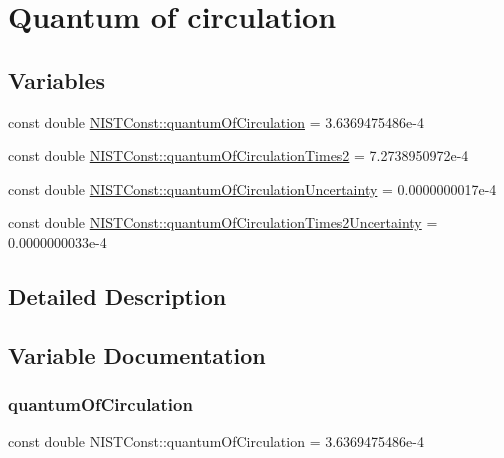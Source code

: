 \hypertarget{group___n_i_s_t_const-_quantum_of_circulation}{}\section{Quantum of circulation}
\label{group___n_i_s_t_const-_quantum_of_circulation}
\subsection*{Variables}
\begin{DoxyCompactItemize}
\item 
const double \hyperlink{group___n_i_s_t_const-_quantum_of_circulation_ga7dbe55704b9a968adfc99d60f5d2dd11}{N\+I\+S\+T\+Const\+::quantum\+Of\+Circulation} = 3.\+6369475486e-\/4
\item 
const double \hyperlink{group___n_i_s_t_const-_quantum_of_circulation_ga86d150a3f178c37f565f6498cf593dbe}{N\+I\+S\+T\+Const\+::quantum\+Of\+Circulation\+Times2} = 7.\+2738950972e-\/4
\item 
const double \hyperlink{group___n_i_s_t_const-_quantum_of_circulation_ga80150c0be4cb14a65256b57d1d0c8eb5}{N\+I\+S\+T\+Const\+::quantum\+Of\+Circulation\+Uncertainty} = 0.\+0000000017e-\/4
\item 
const double \hyperlink{group___n_i_s_t_const-_quantum_of_circulation_gaf5959a1757bc97cebdde9530a370ada3}{N\+I\+S\+T\+Const\+::quantum\+Of\+Circulation\+Times2\+Uncertainty} = 0.\+0000000033e-\/4
\end{DoxyCompactItemize}


\subsection{Detailed Description}


\subsection{Variable Documentation}
\mbox{\label{group___n_i_s_t_const-_quantum_of_circulation_ga7dbe55704b9a968adfc99d60f5d2dd11}} 
\subsubsection{\texorpdfstring{quantum\+Of\+Circulation}{quantumOfCirculation}}
{\footnotesize\ttfamily const double N\+I\+S\+T\+Const\+::quantum\+Of\+Circulation = 3.\+6369475486e-\/4}

